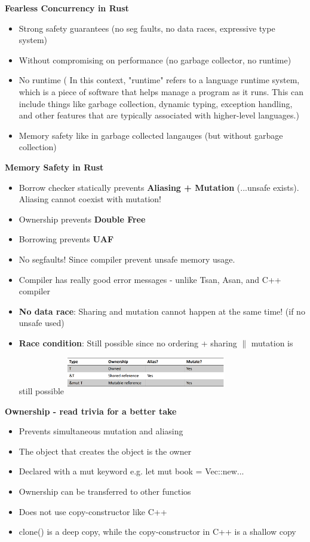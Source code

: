 \documentclass[10pt, landscape]{article}
\begin{document}
\begin{multicols}{4}
\textbf{Fearless Concurrency in Rust} \\
\begin{itemize}
    \item Strong safety guarantees (no seg faults, no data races, expressive type system)
    \item Without compromising on performance (no garbage collector, no runtime)
    \item No runtime ( In this context, "runtime" refers to a language runtime system, which is a piece of software that helps manage a program as it runs. This can include things like garbage collection, dynamic typing, exception handling, and other features that are typically associated with higher-level languages.)
    \item Memory safety like in garbage collected langauges (but without garbage collection)
\end{itemize}

\textbf{Memory Safety in Rust} \\ 
\begin{itemize}
    \item Borrow checker statically prevents \textbf{Aliasing + Mutation} (...unsafe exists). Aliasing cannot coexist with mutation!
    \item Ownership prevents \textbf{Double Free}
    \item Borrowing prevents \textbf{UAF}
    \item No segfaults! Since compiler prevent unsafe memory usage. 
    \item Compiler has really good error messages - unlike Tsan, Asan, and C++ compiler
    \item \textbf{No data race}: Sharing and mutation cannot happen at the same time! (if no unsafe used)
    \item \textbf{Race condition}: Still possible since no ordering + sharing $\|$ mutation is still possible
    \includegraphics*[width=7cm, height=2cm]{rustsafety.png}
\end{itemize}

\textbf{Ownership - read trivia for a better take} \\
\begin{itemize}
    \item Prevents simultaneous mutation and aliasing 
    \item The object that creates the object is the owner 
    \item Declared with a mut keyword e.g. let mut book = Vec::new... 
    \item Ownership can be transferred to other functios
    \item Does not use copy-constructor like C++
    \item clone() is a deep copy, while the copy-constructor in C++ is a shallow copy
\end{itemize}


\end{multicols}
\end{document}
